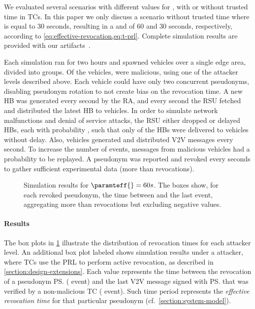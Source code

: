 We evaluated several scenarios with different values for \paramtt{}, with or
without trusted time in \acp{TC}. In this paper we only discuss a scenario
without trusted time where \paramtt{} is equal to 30 seconds, resulting in a
\paramteff{} and \paramtprl{} of 60 and 30 seconds, respectively, according to
\cref{eq:effective-revocation,eq:t-prl}. Complete simulation results are
provided with our artifacts~\cite{supplMaterial}.

Each simulation ran for two hours and spawned \simvehicles{} vehicles over a
single edge area, divided into \simgroups{} groups. Of the vehicles,
\simattackers{} were malicious, using one of the attacker levels described
above. Each vehicle could have only two concurrent pseudonyms, disabling
pseudonym rotation to not create bias on the revocation time. A new \ac{HB} was
generated every second by the \ac{RA}, and every second the \ac{RSU} fetched and
distributed the latest \ac{HB} to vehicles. In order to simulate network
malfunctions and denial of service attacks, the \ac{RSU} either dropped or
delayed \acp{HB}, 
each with probability \simdroprate, such that only \simcorrectrate{} of the
\acp{HB} were delivered to vehicles without delay. Also, vehicles generated and
distributed \ac{V2V} messages every second. To increase the number of
\funcverify{} events, messages from malicious vehicles had a \simreplayrate{}
probability to be replayed. A pseudonym was reported and revoked every
\simrevocationrate{} seconds to gather sufficient experimental data (more than
\simrevocations{} revocations).


\begin{figure}[t]
    \centering
    \hspace*{-0.3cm}
    \resizebox{.9\linewidth}{!} {
      
    } \caption[Simulation results]{Simulation results for $\paramteff{} = 60 s$. The boxes show, for
    each revoked pseudonym, the time between \funcrevokedaa{} and the last
    \funcverify{} event, aggregating more than \simrevocations{} revocations but
    excluding negative values.}
    \label{fig:eval-sim-base}
\end{figure}

\paragraph{Results}
%
The box plots in \cref{fig:eval-sim-base} illustrate the distribution of
revocation times for each attacker level. An additional box plot labeled
\attackersmartprl{} shows simulation results under a \attackersmart{} attacker,
where \acp{TC} use the \ac{PRL} to perform active revocation, as described in
\cref{section:design-extensions}. Each value represents the time between the
revocation of a pseudonym \ps{} (\funcrevokedaa{} event) and the last \ac{V2V}
message signed with \ps{} that was verified by a non-malicious \ac{TC}
(\funcverify{} event). Such time period represents the \emph{effective
revocation time} for that particular pseudonym
(cf.~\cref{section:system-model}).

